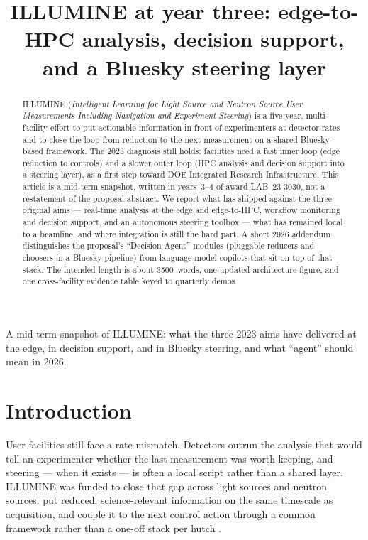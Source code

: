 \documentclass{iucrjournals}
\title{ILLUMINE at year three: edge-to-HPC analysis, decision support, and a
Bluesky steering layer}
\begin{document}
\maketitle

\begin{abstract}
ILLUMINE (\textit{Intelligent Learning for Light Source and Neutron Source User
Measurements Including Navigation and Experiment Steering}) is a five-year,
multi-facility effort to put actionable information in front of experimenters
at detector rates and to close the loop from reduction to the next measurement
on a shared Bluesky-based framework. The 2023 diagnosis still holds: facilities
need a fast inner loop (edge reduction to controls) and a slower outer loop
(HPC analysis and decision support into a steering layer), as a first step
toward DOE Integrated Research Infrastructure. This article is a mid-term
snapshot, written in years~3--4 of award LAB~23-3030, not a restatement of the
proposal abstract. We report what has shipped against the three original aims
--- real-time analysis at the edge and edge-to-HPC, workflow monitoring and
decision support, and an autonomous steering toolbox --- what has remained
local to a beamline, and where integration is still the hard part. A short 2026
addendum distinguishes the proposal's ``Decision Agent'' modules (pluggable
reducers and choosers in a Bluesky pipeline) from language-model copilots that
sit on top of that stack. The intended length is about 3500~words, one updated
architecture figure, and one cross-facility evidence table keyed to quarterly
demos.
\end{abstract}

\begin{synopsis}
A mid-term snapshot of ILLUMINE: what the three 2023 aims have delivered at
the edge, in decision support, and in Bluesky steering, and what ``agent''
should mean in 2026.
\end{synopsis}


\section{Introduction}
\label{sec:intro}

User facilities still face a rate mismatch. Detectors outrun the analysis that
would tell an experimenter whether the last measurement was worth keeping, and
steering --- when it exists --- is often a local script rather than a shared
layer. ILLUMINE was funded to close that gap across light sources and neutron
sources: put reduced, science-relevant information on the same timescale as
acquisition, and couple it to the next control action through a common
framework rather than a one-off stack per hutch \cite{illumine2023}.
\end{document}
